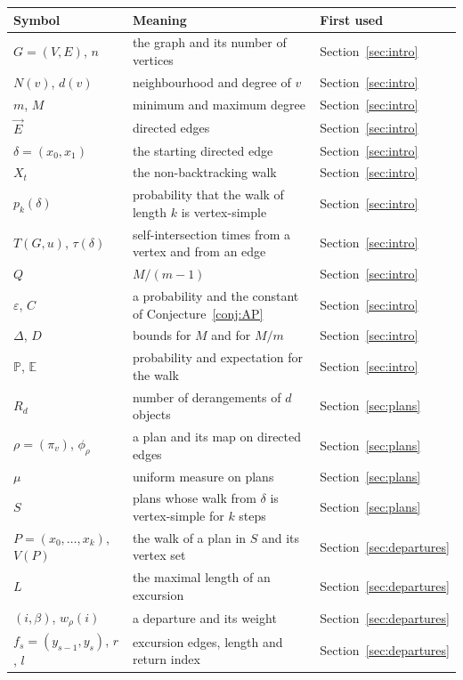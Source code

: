 \documentclass[11pt]{amsart}
\theoremstyle{remark}
\newcommand{\PP}{\mathbb{P}}
\newcommand{\E}{\mathbb{E}}
\newcommand{\vE}{\vec{E}}
\begin{document}
\begin{center}
\small
\begin{tabular}{lll}
\toprule
Symbol & Meaning & First used\\
\midrule
$G=(V,E)$, $n$ & the graph and its number of vertices & Section~\ref{sec:intro}\\
$N(v)$, $d(v)$ & neighbourhood and degree of $v$ & Section~\ref{sec:intro}\\
$m$, $M$ & minimum and maximum degree & Section~\ref{sec:intro}\\
$\vE$ & directed edges & Section~\ref{sec:intro}\\
$\delta=(x_0,x_1)$ & the starting directed edge & Section~\ref{sec:intro}\\
$X_t$ & the non-backtracking walk & Section~\ref{sec:intro}\\
$p_k(\delta)$ & probability that the walk of length $k$ is vertex-simple & Section~\ref{sec:intro}\\
$T(G,u)$, $\tau(\delta)$ & self-intersection times from a vertex and from an edge & Section~\ref{sec:intro}\\
$Q$ & $M/(m-1)$ & Section~\ref{sec:intro}\\
$\varepsilon$, $C$ & a probability and the constant of Conjecture~\ref{conj:AP} & Section~\ref{sec:intro}\\
$\Delta$, $D$ & bounds for $M$ and for $M/m$ & Section~\ref{sec:intro}\\
$\PP$, $\E$ & probability and expectation for the walk & Section~\ref{sec:intro}\\
$R_d$ & number of derangements of $d$ objects & Section~\ref{sec:plans}\\
$\rho=(\pi_v)$, $\phi_\rho$ & a plan and its map on directed edges & Section~\ref{sec:plans}\\
$\mu$ & uniform measure on plans & Section~\ref{sec:plans}\\
$S$ & plans whose walk from $\delta$ is vertex-simple for $k$ steps & Section~\ref{sec:plans}\\
$P=(x_0,\dots,x_k)$, $V(P)$ & the walk of a plan in $S$ and its vertex set & Section~\ref{sec:departures}\\
$L$ & the maximal length of an excursion & Section~\ref{sec:departures}\\
$(i,\beta)$, $w_\rho(i)$ & a departure and its weight & Section~\ref{sec:departures}\\
$f_s=(y_{s-1},y_s)$, $r$, $l$ & excursion edges, length and return index & Section~\ref{sec:departures}\\

\end{tabular}
\end{center}
\end{document}
